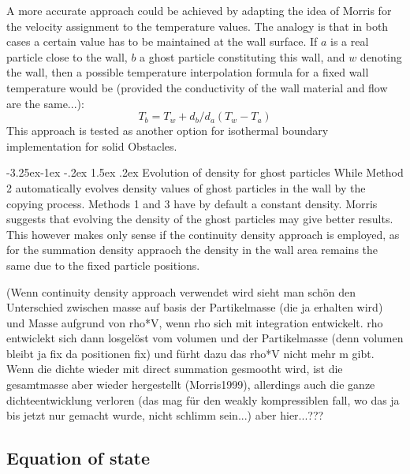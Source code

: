 \documentclass{report}
\makeatletter
\renewcommand\paragraph{\@startsection{paragraph}{4}{\z@}%
  {-3.25ex\@plus -1ex \@minus -.2ex}%
  {1.5ex \@plus .2ex}%
  {\normalfont\normalsize\bfseries}}
\makeatother
\begin{document}
A more accurate approach could be achieved by adapting the idea of Morris for the velocity assignment \cite{Morris1997, Morris999} to the temperature values. The analogy is that in both cases a certain value has to be maintained at the wall surface. If $a$ is a real particle close to the wall, $b$ a ghost particle constituting this wall, and $w$ denoting the wall, then a possible temperature interpolation formula for a fixed wall temperature would be (provided the conductivity of the wall material and flow are the same...):
\begin{equation}
 \label{eq:IsothermalBC_T_interpolation}
T_b=T_w+d_b/d_a(T_w-T_a)
\end{equation}
This approach is tested as another option for isothermal boundary implementation for solid Obstacles.


\paragraph{Evolution of density for ghost particles}
While Method 2 automatically evolves density values of ghost particles in the wall by the copying process. Methods 1 and 3 have by default a constant density. Morris \cite{Morris1997, Morris1999} suggests that evolving the density of the ghost particles may give better results. This however makes only sense if the continuity density approach is employed, as for the summation density appraoch the density in the wall area remains the same due to the fixed particle positions. 

(Wenn continuity density approach verwendet wird sieht man schön den Unterschied zwischen masse auf basis der Partikelmasse (die ja erhalten wird) und Masse aufgrund von rho*V, wenn rho sich mit integration entwickelt. rho entwiclekt sich dann losgelöst vom volumen und der Partikelmasse (denn volumen bleibt ja fix da positionen fix)
und fürht dazu das rho*V nicht mehr m gibt. Wenn die dichte wieder mit direct summation gesmootht wird, ist die gesamtmasse aber wieder hergestellt (Morris1999), allerdings auch die ganze dichteentwicklung verloren (das mag für den weakly kompressiblen fall, wo das ja bis jetzt nur gemacht wurde,  nicht schlimm sein...) aber hier...???




\subsection{Equation of state}
\end{document}

